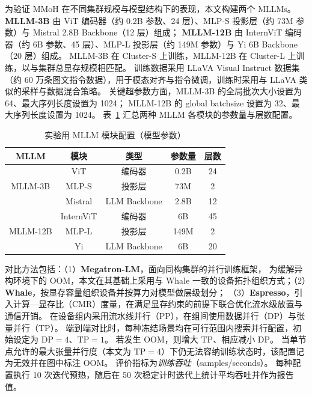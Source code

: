 为验证 MMoH 在不同集群规模与模型结构下的表现，本文构建两个 MLLMs。
\textbf{MLLM-3B} 由 ViT 编码器（约 0.2B 参数、24 层）、MLP-S 投影层（约 73M 参数）与 Mistral 2.8B Backbone（12 层）组成；
\textbf{MLLM-12B} 由 InternViT 编码器（约 6B 参数、45 层）、MLP-L 投影层（约 149M 参数）与 Yi 6B Backbone（20 层）组成。
MLLM-3B 在 Cluster-S 上训练，MLLM-12B 在 Cluster-L 上训练，以与集群总显存规模相匹配。
训练数据采用 LLaVA Visual Instruct 数据集（约 60 万条图文指令数据），用于模态对齐与指令微调，训练时采用与 LLaVA 类似的采样与数据混合策略\cite{llava2023}。
关键超参数方面，MLLM-3B 的全局批次大小设置为 64、最大序列长度设置为 1024；
MLLM-12B 的 global batchsize 设置为 32、最大序列长度设置为 1024。
表~\ref{tab:chap3-module} 汇总两种 MLLM 各模块的参数量与层数配置。

\begin{table}[htbp]
  \centering
  \caption{实验用 MLLM 模块配置（模型参数）}
  \label{tab:chap3-module}
  \renewcommand{\arraystretch}{0.95}
  \setlength{\tabcolsep}{6pt}
  \begin{tabular}{ccccc}
    \toprule
    \multicolumn{1}{c}{\textbf{MLLM}} & \textbf{模块} & \textbf{类型} & \textbf{参数量} & \textbf{层数} \\
    \midrule
    \multirow{3}{*}{MLLM-3B}
    & ViT      & 编码器     & 0.2B  & 24 \\
    & MLP-S    & 投影层     & 73M   & 2 \\
    & Mistral  & LLM Backbone & 2.8B  & 12 \\
    \midrule
    \multirow{3}{*}{MLLM-12B}
    & InternViT & 编码器    & 6B    & 45 \\
    & MLP-L     & 投影层    & 149M  & 2 \\
    & Yi        & LLM Backbone & 6B    & 20 \\
    \bottomrule
  \end{tabular}
\end{table}

对比方法包括：（1）\textbf{Megatron-LM}\cite{megatron2020}，面向同构集群的并行训练框架，
为缓解异构环境下的 OOM，本文在其基础上采用与 Whale 一致的设备拓扑组织方式；（2）\textbf{Whale}\cite{whale}，按显存容量组织设备并按算力对模型做层级划分；
（3）\textbf{Espresso}\cite{espresso2025}，引入计算—显存比（CMR）度量，在满足显存约束的前提下联合优化流水级放置与通信开销。
在设备组内采用流水线并行（PP），在组间使用数据并行（DP）与张量并行（TP）。
端到端对比时，每种冻结场景均在可行范围内搜索并行配置，初始设定为 $\mathrm{DP}{=}4$、$\mathrm{TP}{=}1$。
若发生 OOM，则增大 $\mathrm{TP}$、相应减小 $\mathrm{DP}$。
当单节点允许的最大张量并行度（本文为 $\mathrm{TP}{=}4$）下仍无法容纳训练状态时，该配置记为无效并在图中标注 OOM。
评价指标为\emph{训练吞吐}（samples/seconds）。
每种配置执行 10 次迭代预热，随后在 50 次稳定计时迭代上统计平均吞吐并作为报告值。


